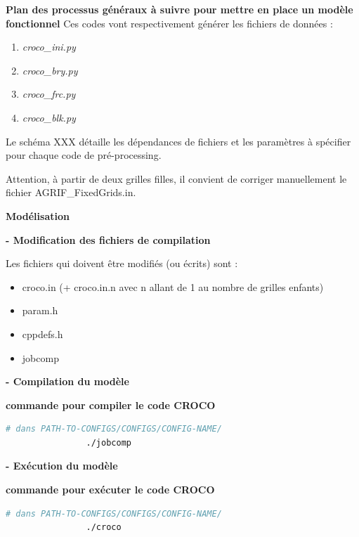 \documentclass[10pt,a4paper,titlepage]{article}
\begin{document}
\begin{processEnv}{\textbf{Plan des processus généraux à suivre pour mettre en place un modèle fonctionnel}}
        Ces codes vont respectivement générer les fichiers de données :
        
        \begin{enumerate}
            \item \textit{croco\_ini.py}
            \item \textit{croco\_bry.py}
            \item \textit{croco\_frc.py}
            \item \textit{croco\_blk.py}
        \end{enumerate}
        
        Le schéma XXX détaille les dépendances de fichiers et les paramètres à spécifier pour chaque code de pré-processing.
        
        Attention, à partir de deux grilles filles, il convient de corriger manuellement le fichier AGRIF\_FixedGrids.in.
        
        {\color{workColor}\textbf{Modélisation}}
        
        \textbf{- Modification des fichiers de compilation}
        
        Les fichiers qui doivent être modifiés (ou écrits) sont :
        
        \begin{itemize}
            \item croco.in (+ croco.in.n avec n allant de 1 au nombre de grilles enfants)
            \item param.h
            \item cppdefs.h
            \item jobcomp
        \end{itemize}
        
        \textbf{- Compilation du modèle}
        
        \begin{codeEnv}{\textbf{commande pour compiler le code CROCO}}
            \begin{lstlisting}[language=bash]
                # dans PATH-TO-CONFIGS/CONFIGS/CONFIG-NAME/
                ./jobcomp
            \end{lstlisting}
        \end{codeEnv}
        
        \textbf{- Exécution du modèle}
        
        \begin{codeEnv}{\textbf{commande pour exécuter le code CROCO}}
            \begin{lstlisting}[language=bash]
                # dans PATH-TO-CONFIGS/CONFIGS/CONFIG-NAME/
                ./croco
            \end{lstlisting}
        \end{codeEnv}
        

\end{processEnv}
\end{document}

